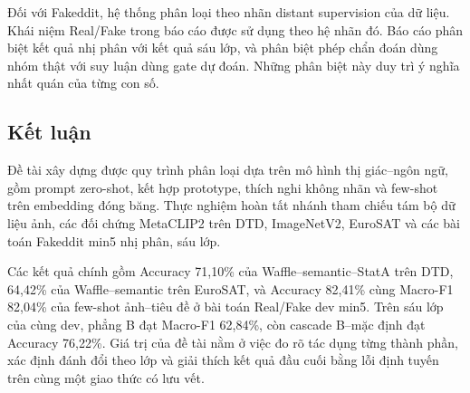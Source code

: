 \documentclass[12pt,a4paper]{article}
\numberwithin{figure}{section}
\numberwithin{table}{section}
\numberwithin{equation}{section}
\begin{document}
Đối với Fakeddit, hệ thống phân loại theo nhãn distant supervision của dữ liệu. Khái niệm Real/Fake trong báo cáo được sử dụng theo hệ nhãn đó. Báo cáo phân biệt kết quả nhị phân với kết quả sáu lớp, và phân biệt phép chẩn đoán dùng nhóm thật với suy luận dùng gate dự đoán. Những phân biệt này duy trì ý nghĩa nhất quán của từng con số.

\subsection{Kết luận}
Đề tài xây dựng được quy trình phân loại dựa trên mô hình thị giác--ngôn ngữ, gồm prompt zero-shot, kết hợp prototype, thích nghi không nhãn và few-shot trên embedding đóng băng. Thực nghiệm hoàn tất nhánh tham chiếu tám bộ dữ liệu ảnh, các đối chứng MetaCLIP2 trên DTD, ImageNetV2, EuroSAT và các bài toán Fakeddit min5 nhị phân, sáu lớp.

Các kết quả chính gồm Accuracy 71,10\% của Waffle--semantic--StatA trên DTD, 64,42\% của Waffle--semantic trên EuroSAT, và Accuracy 82,41\% cùng Macro-F1 82,04\% của few-shot ảnh--tiêu đề ở bài toán Real/Fake dev min5. Trên sáu lớp của cùng dev, phẳng B đạt Macro-F1 62,84\%, còn cascade B--mặc định đạt Accuracy 76,22\%. Giá trị của đề tài nằm ở việc đo rõ tác dụng từng thành phần, xác định đánh đổi theo lớp và giải thích kết quả đầu cuối bằng lỗi định tuyến trên cùng một giao thức có lưu vết.
\clearpage


\end{document}
